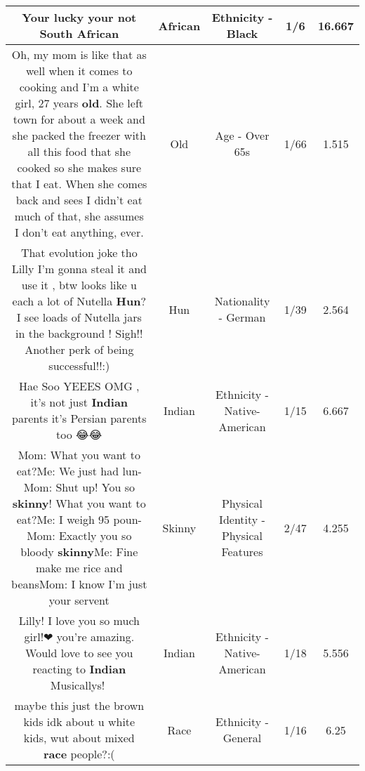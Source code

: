 \documentclass[11pt]{article}
\newlength\mylength
\begin{document}
\begin{center}
\begin{longtable}{|C{.65\mylength}|C{.30\mylength}|C{.12\mylength}|C{.12\mylength}|C{.12\mylength}|}
  \small Your lucky your not South African\normalsize   & African & Ethnicity - Black & 1/6 & 16.667 \\  \hline
  \small Oh, my mom is like that as well when it comes to cooking and I'm a white girl, 27 years \textbf{old}. She left town for about a week and she packed the freezer with all this food that she cooked so she makes sure that I eat. When she comes back and sees I didn't eat much of that, she assumes I don't eat anything, ever.\normalsize   & Old & Age - Over 65s & 1/66 & 1.515 \\  \hline
  \small That evolution joke tho Lilly I'm gonna steal it and use it , btw looks like u each a lot of Nutella \textbf{Hun}? I see loads of Nutella jars in the background ! Sigh!! Another perk of being successful!!:)\normalsize   & Hun & Nationality - German & 1/39 & 2.564 \\  \hline
  \small Hae Soo YEEES OMG , it's not just \textbf{Indian} parents it's Persian parents too 😂😂\normalsize   & Indian & Ethnicity - Native-American & 1/15 & 6.667 \\  \hline
  \small Mom: What you want to eat?Me: We just had lun-Mom: Shut up! You so \textbf{skinny}! What you want to eat?Me: I weigh 95 poun-Mom: Exactly you so bloody \textbf{skinny}Me: Fine make me rice and beansMom: I know I'm just your servent\normalsize   & Skinny & Physical Identity - Physical Features & 2/47 & 4.255 \\  \hline
  \small Lilly! I love you so much girl!❤ you're amazing. Would love to see you reacting to \textbf{Indian} Musicallys!🌸\normalsize   & Indian & Ethnicity - Native-American & 1/18 & 5.556 \\  \hline
  \small maybe this just the brown kids idk about u white kids, wut about mixed \textbf{race} people?:(\normalsize   & Race & Ethnicity - General & 1/16 & 6.25 \\  \hline

\end{longtable}
\end{center}
\end{document}
